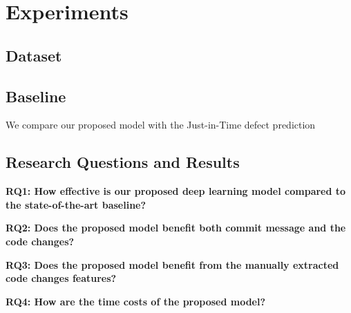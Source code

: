 \section{Experiments}
\label{sec:exp}

\subsection{Dataset}
\subsection{Baseline}
\label{sec:baseline}
We compare our proposed model with the Just-in-Time defect prediction 
\subsection{Research Questions and Results}
\label{sec:rq_results}
\noindent\textbf{RQ1: How effective is our proposed deep learning model compared to the state-of-the-art baseline?}


\noindent\textbf{RQ2: Does the proposed model benefit both commit message and the code changes?}

\noindent\textbf{RQ3: Does the proposed model benefit from the manually extracted code changes features?}

\noindent\textbf{RQ4: How are the time costs of the proposed model?}

